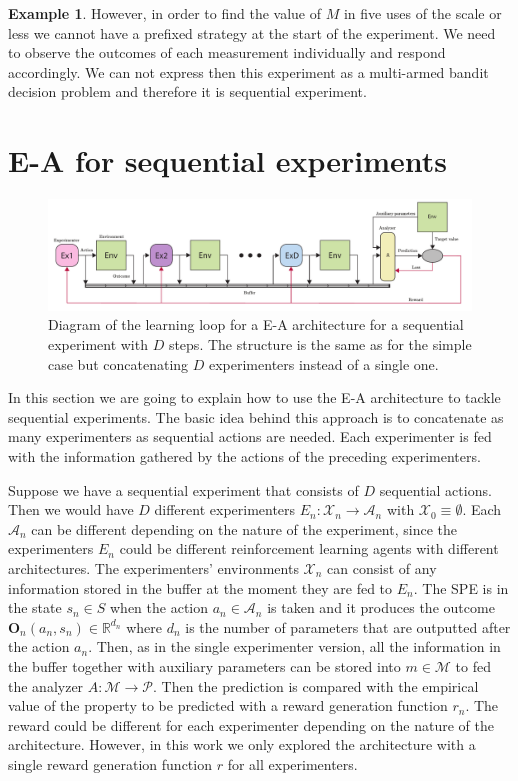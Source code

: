 \documentclass[11pt,a4paper,twoside]{report}
\newcommand{\+}{\textnormal{+} }
\theoremstyle{definition}
\newtheorem{myex}[mythm]{Example}
\numberwithin{equation}{chapter}
\begin{document}
\begin{myex}
However, in order to find the value of $M$ in five uses of the scale or less we
cannot have a prefixed strategy at the start of the experiment. We need to
observe the outcomes of each measurement individually and respond accordingly.
We can not express then this experiment as a multi-armed bandit decision problem
and therefore it is sequential experiment.

\end{myex}

\section{E-A for sequential experiments}

\begin{figure}[t]
  \includegraphics[width=\columnwidth]{figures/sequential-EA.pdf}
  \caption{Diagram of the learning loop for a E-A architecture for a 
  sequential experiment with $D$ steps. The structure is the same as for 
  the simple case but concatenating $D$ experimenters instead of a single one.}
  \label{fig:SequentialEA}
\end{figure}

In this section we are going to explain how to use the E-A architecture to
tackle sequential experiments. The basic idea behind this approach is to
concatenate as many experimenters as sequential actions are needed. Each
experimenter is fed with the information gathered by the actions of the
preceding experimenters. 

Suppose we have a sequential experiment that consists of $D$ sequential actions.
Then we would have $D$ different experimenters $E_n:\mathcal{X}_n\rightarrow
\mathcal{A}_n$ with $\mathcal{X}_0\equiv\emptyset$. Each $\mathcal{A}_n$ can be
different depending on the nature of the experiment, since the experimenters
$E_n$ could be different reinforcement learning agents with different
architectures. The experimenters' environments $\mathcal{X}_n$ can consist of
any information stored in the buffer at the moment they are fed to $E_n$. The
SPE is in the state $s_n \in S$ when the action $a_n \in \mathcal{A}_n$ is taken
and it produces the outcome $\textbf{O}_n(a_n, s_n) \in \mathbb{R}^{d_n}$ where
$d_n$ is the number of parameters that are outputted after the action $a_n$.
Then, as in the single experimenter version, all the information in the buffer
together with auxiliary parameters can be stored into $m\in\mathcal{M}$ to fed
the analyzer $A:\mathcal{M}\rightarrow \mathcal{P}$. Then the prediction is
compared with the empirical value of the property to be predicted with a reward
generation function $r_n$. The reward could be different for each experimenter
depending on the nature of the architecture. However, in this work we only
explored the architecture with a single reward generation function $r$ for all
experimenters.
\end{document}

